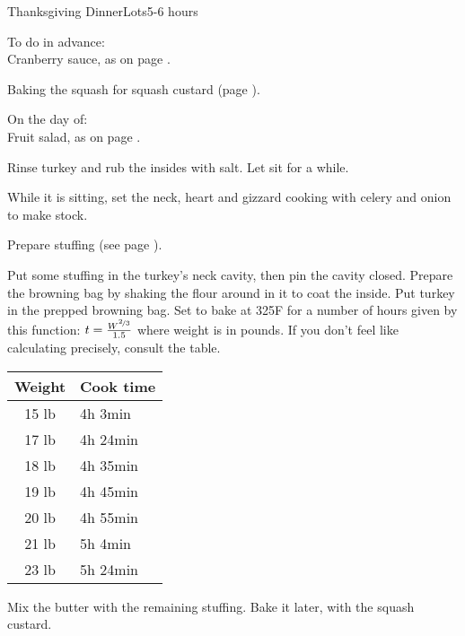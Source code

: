 \documentclass[../Cookbook.tex]{subfiles}
\begin{document}
\begin{recipe}{Thanksgiving Dinner}{Lots}{5-6 hours}

To do in advance: \\
Cranberry sauce, as on page \pageref{CranberrySauce}.

Baking the squash for squash custard (page \pageref{SquashCustard}).

\newstep
On the day of: \\
Fruit salad, as on page \pageref{FruitSalad}.

Rinse turkey and rub the insides with salt. Let sit for a while.

While it is sitting, set the neck, heart and gizzard cooking with celery and onion to make stock.

Prepare stuffing (see page \pageref{Stuffing}).

\begin{minipage}{.7\textwidth}
	Put some stuffing in the turkey's neck cavity, then pin the cavity closed.
	Prepare the browning bag by shaking the flour around in it to coat the inside.
	Put turkey in the prepped browning bag.
	Set to bake at 325\0F for a number of hours given by this function:
	$ t = \frac{W^{\nicefrac{2}{3}}}{1.5} $
	where weight is in pounds.
	If you don't feel like calculating precisely, consult the table.
\end{minipage}
\begin{minipage}{.29\textwidth}
	\begin{tabular}{cl}
		Weight & Cook time \\ \hline
		15 lb & 4h 3min \\
		17 lb & 4h 24min \\
		18 lb & 4h 35min \\
		19 lb & 4h 45min \\
		20 lb & 4h 55min \\
		21 lb & 5h 4min \\
		23 lb & 5h 24min
	\end{tabular}
\end{minipage}

Mix the butter with the remaining stuffing. Bake it later, with the squash custard.


\end{recipe}
\end{document}
